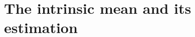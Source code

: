 \documentclass[journal]{IEEEtran}
\begin{document}




\section{The intrinsic mean and its estimation}\label{sec:unwr-mean-vari}
\end{document}
